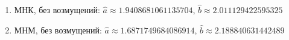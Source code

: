 \begin{enumerate}
\item МНК, без возмущений:
$\hat{a}\approx 1.9408681061135704$, $\hat{b}\approx 2.011129422595325$
\item МНМ, без возмущений:
$\hat{a}\approx 1.6871749684086914$, $\hat{b}\approx 2.188840631442489$
\end{enumerate}
